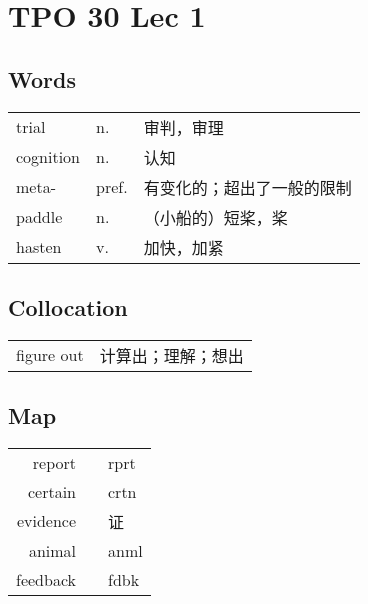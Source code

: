 \section{TPO 30 Lec 1}

\subsection{Words}

\begin{tabular}{lll}
    trial     & n.    & 审判，审理         \\
    cognition & n.    & 认知            \\
    meta-     & pref. & 有变化的；超出了一般的限制 \\
    paddle    & n.    & （小船的）短桨，桨     \\
    hasten    & v.    & 加快，加紧         \\
\end{tabular}

\subsection{Collocation}

\begin{tabular}{ll}
    figure out & 计算出；理解；想出 \\
\end{tabular}

\subsection{Map}

\begin{tabular}{rc@{\quad$\to$\quad}l}
    report   &  & rprt \\
    certain  &  & crtn \\
    evidence &  & 证    \\
    animal   &  & anml \\
    feedback &  & fdbk \\
\end{tabular}

\newpage
